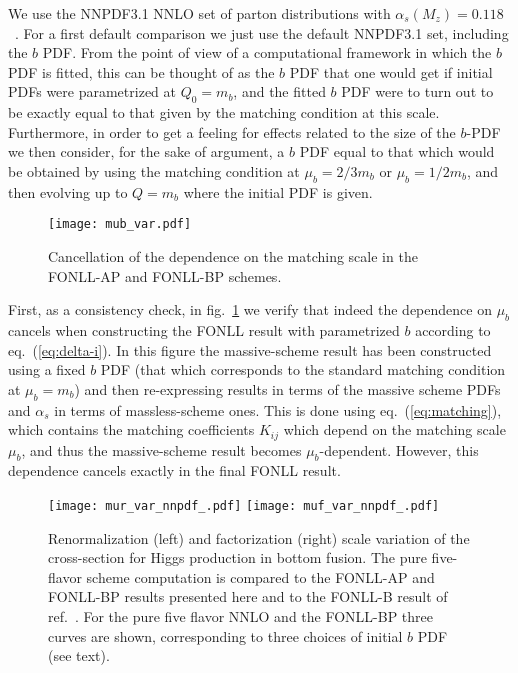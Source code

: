 We use the  NNPDF3.1 NNLO set of parton distributions with
$\alpha_s(M_z)=0.118$~\cite{Ball:2017nwa}. For a first default
comparison we just use the default NNPDF3.1 set, including the $b$
PDF. From the point of view of a computational framework in which the
$b$ PDF is fitted,
this can be thought of as the $b$ PDF that one would get if initial
PDFs were parametrized at $Q_0=m_b$, and the fitted $b$ PDF were to
turn out to be exactly equal to that given by the matching condition
at this scale. Furthermore, in order
to get a feeling for effects related to the size of
the $b$-PDF we then consider, for the sake of argument, a $b$ PDF
equal to that which would be obtained by using the matching condition
at $\mu_b = 2/3 m_b$ or $\mu_b = 1/2 m_b$, and then evolving up to
$Q=m_b$ where the initial PDF is given.

\begin{figure}[htbp]
  \centering
  \texttt{[image: mub\_var.pdf]}
  \caption{Cancellation of the dependence on the matching scale in the
  FONLL-AP and FONLL-BP schemes.}
  \label{fig:mub-var}
\end{figure}
First, as a consistency check, in fig.~\ref{fig:mub-var} we verify that
indeed the dependence on $\mu_b$ cancels when constructing the FONLL
result with parametrized $b$ according to eq.~(\ref{eq:delta-i}). In
this figure the massive-scheme result has been constructed using a
fixed  $b$ PDF (that which corresponds to the standard matching
condition at $\mu_b=m_b$) and then re-expressing results in terms of
the massive scheme PDFs  and $\alpha_s$ in terms of massless-scheme
ones. This is done using eq.~(\ref{eq:matching}), which contains the
matching coefficients $K_{ij}$ which depend on the matching scale
$\mu_b$, and thus the massive-scheme result becomes
$\mu_b$-dependent.
However, this dependence cancels exactly in the final
FONLL result.

\begin{figure}[htbp]
  \centering
  \texttt{[image: mur\_var\_nnpdf\_.pdf]}
  \texttt{[image: muf\_var\_nnpdf\_.pdf]}
  \caption{Renormalization (left) and factorization (right) scale
    variation of the cross-section for Higgs production in bottom
    fusion. The pure five-flavor scheme computation is compared to the
  FONLL-AP and FONLL-BP results presented here and to the FONLL-B
  result of ref.~\cite{Forte:2015hba}. For the pure five flavor
  NNLO and the  FONLL-BP three curves are shown, corresponding to 
  three choices of initial $b$ PDF (see text).
  }
  \label{fig:scale-var}
\end{figure}


